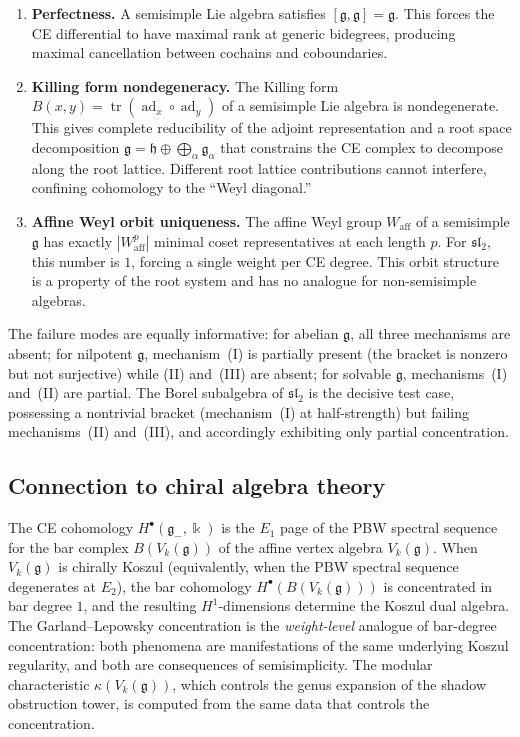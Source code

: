 \documentclass[11pt,reqno]{amsart}
\theoremstyle{plain}
\theoremstyle{definition}
\theoremstyle{remark}
\DeclareMathOperator{\ad}{ad}
\DeclareMathOperator{\tr}{tr}
\newcommand{\fg}{\mathfrak{g}}
\newcommand{\fh}{\mathfrak{h}}
\newcommand{\Waff}{W_{\mathrm{aff}}}
\newcommand{\gminus}{\fg_{-}}
\newcommand{\kk}{\Bbbk}
\begin{document}
\begin{enumerate}[label=(\Roman*),leftmargin=*]
 \item \textbf{Perfectness.} A semisimple Lie algebra satisfies $[\fg, \fg] = \fg$.
 This forces the CE differential to have maximal rank at generic bidegrees,
 producing maximal cancellation between cochains and coboundaries.

 \item \textbf{Killing form nondegeneracy.} The Killing form $B(x,y) =
 \tr(\ad_x \circ \ad_y)$ of a semisimple Lie algebra is nondegenerate.
 This gives complete reducibility of the adjoint representation and a root
 space decomposition $\fg = \fh \oplus \bigoplus_\alpha \fg_\alpha$ that
 constrains the CE complex to decompose along the root lattice. Different
 root lattice contributions cannot interfere, confining cohomology to the
 ``Weyl diagonal.''

 \item \textbf{Affine Weyl orbit uniqueness.} The affine Weyl group $\Waff$
 of a semisimple $\fg$ has exactly $|\Waff^p|$ minimal coset representatives
 at each length $p$. For $\mathfrak{sl}_2$, this number is $1$, forcing a
 single weight per CE degree. This orbit structure is a property of the root
 system and has no analogue for non-semisimple algebras.
\end{enumerate}

The failure modes are equally informative: for abelian $\fg$, all three
mechanisms are absent; for nilpotent $\fg$, mechanism~(I) is partially present
(the bracket is nonzero but not surjective) while (II) and~(III) are absent;
for solvable $\fg$, mechanisms~(I) and~(II) are partial. The Borel subalgebra
of $\mathfrak{sl}_2$ is the decisive test case, possessing a nontrivial
bracket (mechanism~(I) at half-strength) but failing mechanisms~(II) and~(III),
and accordingly exhibiting only partial concentration.

\subsection{Connection to chiral algebra theory}

The CE cohomology $H^\bullet(\gminus, \kk)$ is the $E_1$ page of the PBW
spectral sequence for the bar complex $B(V_k(\fg))$ of the affine vertex
algebra $V_k(\fg)$. When $V_k(\fg)$ is chirally Koszul (equivalently, when
the PBW spectral sequence degenerates at $E_2$), the bar cohomology
$H^\bullet(B(V_k(\fg)))$ is concentrated in bar degree $1$, and the resulting
$H^1$-dimensions determine the Koszul dual algebra. The
Garland--Lepowsky concentration is the \emph{weight-level} analogue of
bar-degree concentration: both phenomena are manifestations of the same
underlying Koszul regularity, and both are consequences of semisimplicity.
The modular characteristic $\kappa(V_k(\fg))$, which controls the genus
expansion of the shadow obstruction tower, is computed from the same data
that controls the concentration.
\end{document}
